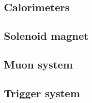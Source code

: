 \subsection{Calorimeters} \label{sec:Calorimeters}


\subsection{Solenoid magnet} \label{sec:SolenoidMagnet}


\subsection{Muon system} \label{sec:MuonSystem}


\subsection{Trigger system} \label{sec:Trigger}
 